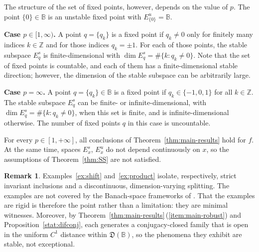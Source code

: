 \documentclass[12pt]{article}
\newcommand{\Bb}{\mathbb{B}}
\newcommand{\Zz}{\mathbb{Z}}
\newcommand{\DUC}{\mathfrak{D}}
\theoremstyle{definition}
\newtheorem{remark}[thm]{Remark}
\begin{document}
The structure of the set of fixed points, however, depends on the value of $p$. The point $\{0\} \in \Bb$ is an unstable fixed point with $E^u_{\{0\}} = \Bb$.

\textbf{Case $p \in [1, \infty)$.} A point $q = \{q_k\}$ is a fixed point if $q_k \ne 0$ only for finitely many indices $k \in \Zz$ and for those indices $q_k = \pm 1$. For each of those points, the stable subspace $E^s_q$ is finite-dimensional with $\dim E^s_q = \#\{k: q_k \ne 0\}$. Note that the set of fixed points is countable,  and each of them has a finite-dimensional stable direction; however, the dimension of the stable subspace can be arbitrarily large. %

\textbf{Case $p = \infty$.} A point $q = \{q_k\} \in \Bb$ is a fixed point if $q_k \in \{-1, 0, 1\}$ for all $k \in \Zz$. The stable subspace $E^s_q$ can be finite- or infinite-dimensional, with
$\dim E^s_q=\#\{k:q_k\ne0\}$, when this set is finite, and is
infinite-dimensional otherwise. The number of fixed points $q$ in this case is uncountable. 

For every $p\in[1,+\infty]$, all conclusions of Theorem~\ref{thm:main-results} hold for $f$.
At the same time, spaces $E^s_x$, $E^u_x$ do not depend continuously on $x$, so the assumptions of Theorem~\ref{thm:SS} are not satisfied. 

\begin{remark}\label{rem:minimal}
Examples~\ref{ex:shift} and~\ref{ex:product} isolate, respectively, strict invariant inclusions and a discontinuous, dimension-varying splitting.
The examples are not covered by the Banach-space frameworks of
\cite{SteinleinWalther1990,LaniWayda1995,Henry1981,SellYou}.
That the examples are rigid is therefore the point rather than a limitation: they are minimal witnesses.
Moreover, by Theorem~\ref{thm:main-results}\,(\ref{item:main-robust}) and Proposition~\ref{stat:difconj}, each generates a conjugacy-closed family that is open in the uniform $C^1$ distance within $\DUC(\Bb)$, so the phenomena they exhibit are stable, not exceptional.
\end{remark}
\end{document}
